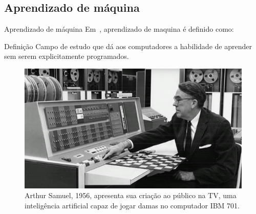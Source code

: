 \documentclass{templatebeamerufc/libs/ufc_format}
\begin{document}
\subsection{Aprendizado de máquina}

\begin{frame}{Aprendizado de máquina}
  Em~\cite{samuel1959some}, aprendizado de maquina é definido como:

  \begin{block}{Definição} Campo de estudo que dá aos computadores a
    habilidade de aprender sem serem explicitamente programados.
  \end{block}

  \pause{}

  \begin{figure}\label{fig:samuel}
    \centering
    \caption{
      Arthur Samuel, 1956, apresenta sua criação ao público na
      TV, uma inteligência artificial capaz de jogar damas no
      computador IBM 701.
    }
    \includegraphics[scale=0.18]{figuras/samuel}
  \end{figure}
\end{frame}
\end{document}

